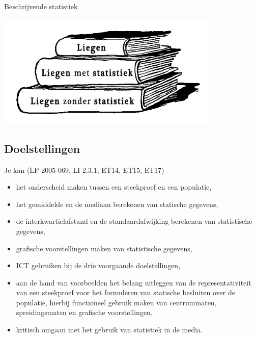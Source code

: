 \documentclass[12pt,twoside]{article}
\begin{document}
\thispagestyle{empty}
\begin{center}
  \begin{mdframed}
  \centering
  \fontsize{40}{60}\selectfont Beschrijvende statistiek
  \end{mdframed}
  \vfill
  \includegraphics[width=0.8\textwidth]{statistiek_hoe_liegen}
  \vfill
\end{center}
\vfill
\subsection*{Doelstellingen}
{\singlespacing
Je kan \hfill (LP 2005-069, LI 2.3.1, ET14, ET15, ET17)
\begin{itemize}
  \item het onderscheid maken tussen een steekproef en een populatie,
  \item het gemiddelde en de mediaan berekenen van statische gegevens,
  \item de interkwartielafstand en de standaardafwijking berekenen van statistische gegevens,
  \item grafische voorstellingen maken van statistische gegevens,
  \item ICT gebruiken bij de drie voorgaande doelstellingen,
  \item aan de hand van voorbeelden het belang uitleggen van de representativiteit van een steekproef voor het formuleren van statische besluiten over de populatie, hierbij functioneel gebruik maken van centrummaten, spreidingsmaten en grafische voorstellingen,
  \item kritisch omgaan met het gebruik van statistiek in de media.
\end{itemize}
}

\thispagestyle{empty}
\newpage
\thispagestyle{empty}
\tableofcontents
\newpage
\clearpage
{}
\pagestyle{fancy}
\lhead{}

\fancyhead[RE,LO]{}
\end{document}
